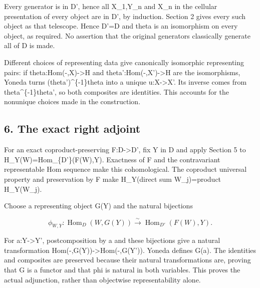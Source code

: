 \documentclass[11pt]{article}
\begin{document}
Every generator is in D',\allowbreak{} hence all X\_\allowbreak{}1,\allowbreak{}Y\_\allowbreak{}n and X\_\allowbreak{}n in the cellular presentation of every object are in D',\allowbreak{} by induction. Section 2 gives every such object as that telescope. Hence D'\allowbreak{}=D and theta is an isomorphism on every object,\allowbreak{} as required. No assertion that the original generators classically generate all of D is made.

Different choices of representing data give canonically isomorphic representing pairs:\allowbreak{} if theta:\allowbreak{}Hom(-,\allowbreak{}X)\allowbreak{}\allowbreak{}->H and theta':\allowbreak{}Hom(-,\allowbreak{}X')\allowbreak{}\allowbreak{}->H are the isomorphisms,\allowbreak{} Yoneda turns (theta')\allowbreak{}\textasciicircum{}\{-1\}theta into a unique u:\allowbreak{}X\allowbreak{}->X'. Its inverse comes from theta\textasciicircum{}\{-1\}theta',\allowbreak{} so both composites are identities. This accounts for the nonunique choices made in the construction.

\subsection{6. The exact right adjoint}\label{proofs-11121-11450-the-exact-right-adjoint}

For an exact coproduct-preserving F:\allowbreak{}D\allowbreak{}->D',\allowbreak{} fix Y in D\textquotesingle{} and apply Section 5 to H\_\allowbreak{}Y(W)\allowbreak{}\allowbreak{}=Hom\_\allowbreak{}\{D'\}(F(W)\allowbreak{},\allowbreak{}Y)\allowbreak{}. Exactness of F and the contravariant representable Hom sequence make this cohomological. The coproduct universal property and preservation by F make H\_\allowbreak{}Y(direct sum W\_\allowbreak{}j)\allowbreak{}\allowbreak{}=product H\_\allowbreak{}Y(W\_\allowbreak{}j)\allowbreak{}.

Choose a representing object G(Y)\allowbreak{} and the natural bijections

\[
 \phi_{W,Y}:\operatorname{Hom}_D(W,G(Y))
        \xrightarrow{\sim}\operatorname{Hom}_{D'}(F(W),Y).
\]

For a:\allowbreak{}Y\allowbreak{}->Y',\allowbreak{} postcomposition by a and these bijections give a natural transformation Hom(-,\allowbreak{}G(Y)\allowbreak{})\allowbreak{}\allowbreak{}->Hom(-,\allowbreak{}G(Y')\allowbreak{})\allowbreak{}. Yoneda defines G(a)\allowbreak{}. The identities and composites are preserved because their natural transformations are,\allowbreak{} proving that G is a functor and that phi is natural in both variables. This proves the actual adjunction,\allowbreak{} rather than objectwise representability alone.
\end{document}
